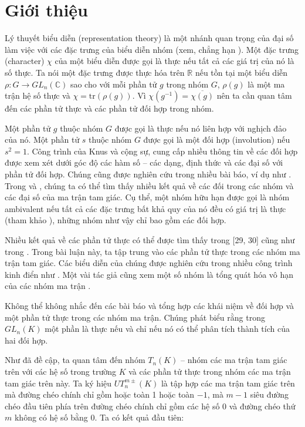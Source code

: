\chapter{Giới thiệu}
Lý thuyết biểu diễn (representation theory) là một nhánh quan trọng của đại số làm việc với các đặc trưng của biểu diễn nhóm (xem, chẳng hạn \cite{JamesLiebeck2001, Kirillov1994, Kirillov1995}). Một đặc trưng (character) $\chi$ của một biểu diễn được gọi là thực nếu tất cả các giá trị của nó là số thực. Ta nói một đặc trưng được thực hóa trên $\mathbb{R}$ nếu tồn tại một biểu diễn $\rho : G \to GL_n(\mathbb{C})$ sao cho với mỗi phần tử $g$ trong nhóm $G$, $\rho(g)$ là một ma trận hệ số thực và $\chi = \text{tr}(\rho(g))$. Vì $\chi(g^{-1}) = \overline{\chi(g)}$ nên ta cần quan tâm đến các phần tử thực và các phần tử đối hợp trong nhóm.

Một phần tử $g$ thuộc nhóm $G$ được gọi là thực nếu nó liên hợp với nghịch đảo của nó. Một phần tử $s$ thuộc nhóm $G$ được gọi là một đối hợp (involution) nếu $s^2 = 1$. Công trình của Knus và cộng sự, \cite{KnusMerkurjevRostTignol1998} cung cấp nhiều thông tin về các đối hợp được xem xét dưới góc độ các hàm số – các dạng, định thức và các đại số với phần tử đối hợp. Chúng cũng được nghiên cứu trong nhiều bài báo, ví dụ như \cite{Ellers1979, Furtado2008,Pankov2005}. Trong \cite{IsaacsKaragueuzian2005} và \cite{DiVincenzoKoshlukovLaScala2006}, chúng ta có thể tìm thấy nhiều kết quả về các đối trong các nhóm và các đại số của ma trận tam giác. Cụ thể, một nhóm hữu hạn được gọi là nhóm ambivalent nếu tất cả các đặc trưng bất khả quy của nó đều có giá trị là thực (tham khảo \cite{Armeanu1996, ArmeanuVarga2001}), những nhóm như vậy chỉ bao gồm các đối hợp.

Nhiều kết quả về các phần tử thực có thể được tìm thấy trong [29, 30] cũng như trong \cite{TiepZalesski2005}. Trong bài luận này, ta tập trung vào các phần tử thực trong các nhóm ma trận tam giác. Các biểu diễn của chúng được nghiên cứu trong nhiều công trình kinh điển như \cite{KerovKirillov1995,Kosyak1990,Kosyak2000,Kosyak2003}. Một vài tác giả cũng xem một số nhóm là tổng quát hóa vô hạn của các nhóm ma trận \cite{AlberioKosyak2005,AlberioKosyak2006}.

Không thể không nhắc đến các bài báo \cite{Wonenburger1966} và \cite{Djokovic1967} tổng hợp  các khái niệm về đối hợp và một phần tử thực trong các nhóm ma trận. Chúng phát biểu rằng trong $GL_n(K)$ một phần là thực nếu và chỉ nếu nó có thể phân tích thành tích của hai đối hợp.

Như đã đề cập, ta quan tâm đến nhóm $T_n(K)$ – nhóm các ma trận tam giác trên với các hệ số trong trường $K$ và các phần tử thực trong nhóm các ma trận tam giác trên này. Ta ký hiệu $UT_n^{m\pm} (K)$ là tập hợp các ma trận tam giác trên mà đường chéo chính chỉ gồm hoặc toàn 1 hoặc toàn $-1$, mà $m-1$ siêu đường chéo đầu tiên phía trên đường chéo chính chỉ gồm các hệ số $0$ và đường chéo thứ $m$ không có hệ số bằng $0$. Ta có kết quả đầu tiên:


